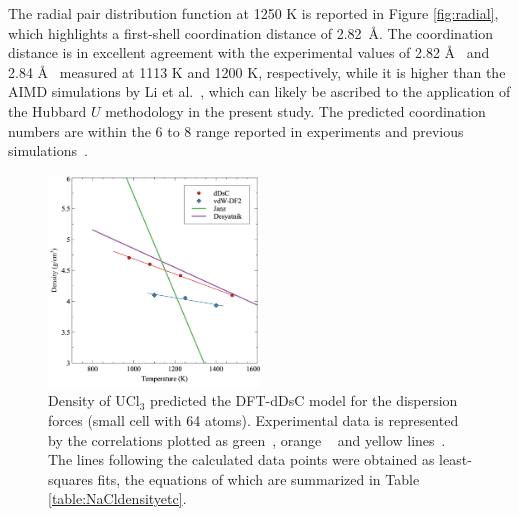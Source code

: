 \documentclass[preprint,3p,10pt,onecolumn,number,sort&compress]{elsarticle}
\begin{document}
{ 
The radial pair distribution function at 1250 K is reported in Figure \ref{fig:radial}, which highlights a first-shell coordination distance of 2.82~\AA. The coordination distance is in excellent agreement with the experimental values of 2.82 \AA~\cite{Neilson} and 2.84 \AA~\cite{Okamoto} measured at 1113 K and 1200 K, respectively, while it is higher than the AIMD simulations by Li et al.~\cite{Li}, which can likely be ascribed to the application of the Hubbard $U$ methodology in the present study. The predicted coordination numbers are within the 6 to 8 range reported in experiments and previous simulations~\cite{Li,Neilson,Okamoto}. %
 

\begin{figure}[htb]
\centering
\includegraphics[width=0.5\textwidth]{fig5.jpg}
\caption{Density of UCl$_3$ predicted the DFT-dDsC model for the dispersion forces (small cell with 64 atoms). Experimental data is represented by the correlations plotted as green~\cite{Desyatnik}, orange ~\cite{Janz1988} and yellow lines~\cite{Parker}. The lines following the calculated data points were obtained as least-squares fits, the equations of which are summarized in Table \ref{table:NaCldensityetc}.} %
\label{fig:UCl3density}
\end{figure}

}
\end{document}
